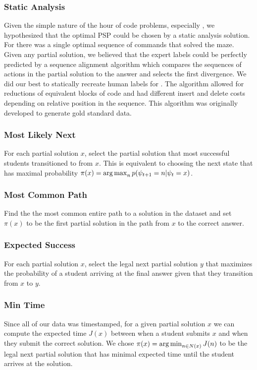 \subsubsection{Static Analysis}
Given the simple nature of the hour of code problems, especially \Pa, we hypothesized that the optimal PSP could be chosen by a static analysis solution. For \Pa there was a single optimal sequence of commands that solved the maze. Given any partial solution, we believed that the expert labels could be perfectly predicted by a sequence alignment algorithm which compares the sequences of actions in the partial solution to the answer and selects the first divergence. We did our best to statically recreate human labels for \Pa. The algorithm allowed for reductions of equivalent blocks of code and had different insert and delete costs depending on relative position in the sequence. This algorithm was originally developed to generate gold standard data.


\subsubsection{Most Likely Next}
For each partial solution $x$, select the partial solution that most successful students transitioned to from $x$. This is equivalent to choosing the next state that has maximal probability $\pi{(x)} = \operatorname*{arg\,max}_{n}{p(\psi_{t+1} = n | \psi_t = x)}$. 

\subsubsection{Most Common Path}
Find the the most common entire path to a solution in the dataset and set $\pi(x)$ to be the first partial solution in the path from $x$ to the correct answer.

\subsubsection{Expected Success}
For each partial solution $x$, select the legal next partial solution $y$ that maximizes the probability of a student arriving at the final answer given that they transition from $x$ to $y$. 

\subsubsection{Min Time}
Since all of our data was timestamped, for a given partial solution $x$ we can compute the expected time $J(x)$ between when a student submits $x$ and when they submit the correct solution. We chose $\pi(x) = \operatorname*{arg\,min}_{n \in N(x)}J(n)$ to be the legal next partial solution that has minimal expected time until the student arrives at the solution.

